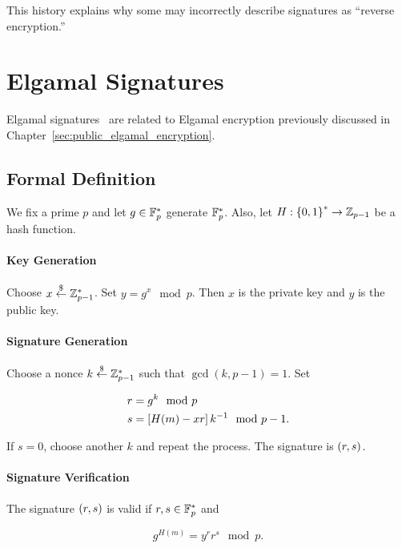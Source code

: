 This history explains why some may incorrectly describe \glspl{signature}
as ``reverse encryption.''



\section{Elgamal Signatures}
\label{sec:signatures_elgamal}

Elgamal signatures~\cite{elgamal1985public} are related to
Elgamal encryption previously discussed
in Chapter~\ref{sec:public_elgamal_encryption}.

\subsection{Formal Definition}

\begin{defn}
We fix a prime $p$ and let $g\in\mathbb{F}_{p}^{*}$ generate $\mathbb{F}_{p}^{*}$.
Also, let $H:\left\{ 0,1 \right\}^{*}\to\mathbb{Z}_{p-1}$ be a \gls{hash function}.

\paragraph{Key Generation}
Choose $x\stackrel{\$}{\leftarrow}{}\mathbb{Z}_{p-1}^{*}$.
Set $y = g^{x} \mod p$.
Then $x$ is the private key and $y$ is the public key.

\paragraph{Signature Generation}
Choose a \gls{nonce} $k\stackrel{\$}{\leftarrow}{}\mathbb{Z}_{p-1}^{*}$
such that $\gcd(k,p-1) = 1$.
Set

\begin{align}
    r &= g^{k} \mod p \nonumber\\
    s &= \left[ H(m) - xr \right]k^{-1} \mod p-1.
\end{align}

\noindent
If $s=0$, choose another $k$ and repeat the process.
The signature is $\left( r,s \right)$.

\paragraph{Signature Verification}
The signature $\left( r,s \right)$ is valid if $r,s\in\mathbb{F}_{p}^{*}$ and

\begin{equation}
    g^{H(m)} = y^{r}r^{s} \mod p.
\end{equation}
\end{defn}

